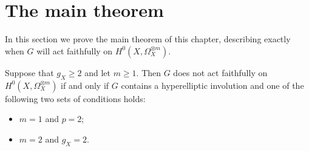 \section{The main theorem}\label{maintheoremsection}
In this section we prove the main theorem of this chapter, describing exactly when $G$ will act faithfully on $H^0(X,\Omega_X^{\otimes m})$.


    \begin{thm}\label{theoremfaithfulaction}
    Suppose that $g_X\geq 2$ and let $m\geq1$. 
    Then $G$ does not act faithfully on $H^0(X,\Omega_X^{\otimes m})$ if and only if $G$ contains a hyperelliptic involution and one of the following two sets of conditions holds:
        \begin{itemize}
        \item $m=1$ and $p=2$;
        \item $m=2$ and $g_X=2$.
        \end{itemize}
    \end{thm}
